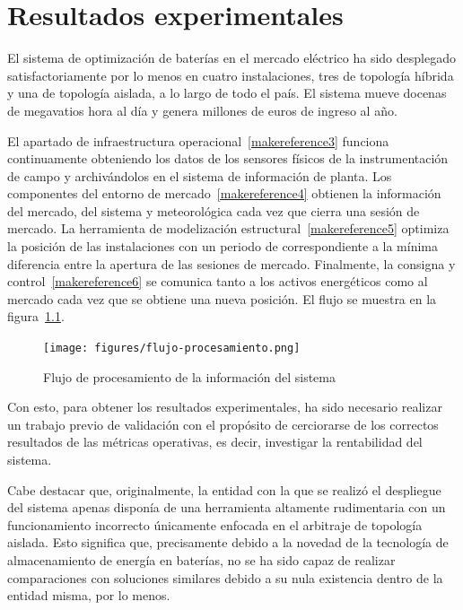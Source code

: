\cleardoublepage

\chapter{Resultados experimentales}
\label{makereference7}

El sistema de optimización de baterías en el mercado eléctrico ha sido desplegado satisfactoriamente por lo menos en cuatro instalaciones, tres de topología híbrida y una de topología aislada, a lo largo de todo el país. El sistema mueve docenas de megavatios hora al día y genera millones de euros de ingreso al año.

El apartado de infraestructura operacional~\ref{makereference3} funciona continuamente obteniendo los datos de los sensores físicos de la instrumentación de campo y archivándolos en el sistema de información de planta. Los componentes del entorno de mercado~\ref{makereference4} obtienen la información del mercado, del sistema y meteorológica cada vez que cierra una sesión de mercado. La herramienta de modelización estructural~\ref{makereference5} optimiza la posición de las instalaciones con un periodo de correspondiente a la mínima diferencia entre la apertura de las sesiones de mercado. Finalmente, la consigna y control~\ref{makereference6} se comunica tanto a los activos energéticos como al mercado cada vez que se obtiene una nueva posición. El flujo se muestra en la figura~\ref{fig:flujo-procesamiento}.

\begin{figure}
  \centering
  \texttt{[image: figures/flujo-procesamiento.png]}
  \caption{Flujo de procesamiento de la información del sistema}
  \label{fig:flujo-procesamiento}
\end{figure}

Con esto, para obtener los resultados experimentales, ha sido necesario realizar un trabajo previo de validación con el propósito de cerciorarse de los correctos resultados de las métricas operativas, es decir, investigar la rentabilidad del sistema.

Cabe destacar que, originalmente, la entidad con la que se realizó el despliegue del sistema apenas disponía de una herramienta altamente rudimentaria con un funcionamiento incorrecto únicamente enfocada en el arbitraje de topología aislada. Esto significa que, precisamente debido a la novedad de la tecnología de almacenamiento de energía en baterías, no se ha sido capaz de realizar comparaciones con soluciones similares debido a su nula existencia dentro de la entidad misma, por lo menos.

